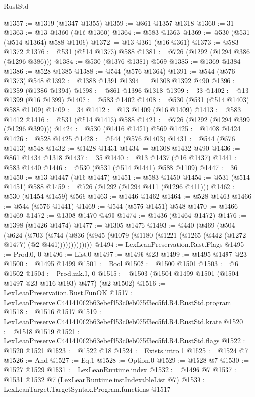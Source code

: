 \begin{lexlean}{RustStd}
\begin{coremodule}
@1357 := @1319 (@1347 @1355)
@1359 := @861 @1357 @1318
@1360 := 31
@1363 := @13 @1360 (@16 @1360)
@1364 := @583 @1363
@1369 := @530 (@531 (@514 @1364) @588 @1109)
@1372 := @13 @361 (@16 @361)
@1373 := @583 @1372
@1376 := @531 (@514 @1373) @588
@1381 := @726 (@1292 (@1294 @386 (@1296 @386)))
@1384 := @530 (@1376 @1381) @569
@1385 := @1369 @1384
@1386 := @528 @1385
@1388 := @544 (@576 @1364)
@1391 := @544 (@576 @1373) @548
@1392 := @1388 @1391
@1394 := @1308 @1392 @490
@1396 := @1359 (@1386 @1394)
@1398 := @861 @1396 @1318
@1399 := 33
@1402 := @13 @1399 (@16 @1399)
@1403 := @583 @1402
@1408 := @530 (@531 (@514 @1403) @588 @1109)
@1409 := 34
@1412 := @13 @1409 (@16 @1409)
@1413 := @583 @1412
@1416 := @531 (@514 @1413) @588
@1421 := @726 (@1292 (@1294 @399 (@1296 @399)))
@1424 := @530 (@1416 @1421) @569
@1425 := @1408 @1424
@1426 := @528 @1425
@1428 := @544 (@576 @1403)
@1431 := @544 (@576 @1413) @548
@1432 := @1428 @1431
@1434 := @1308 @1432 @490
@1436 := @861 @1434 @1318
@1437 := 35
@1440 := @13 @1437 (@16 @1437)
@1441 := @583 @1440
@1446 := @530 (@531 (@514 @1441) @588 @1109)
@1447 := 36
@1450 := @13 @1447 (@16 @1447)
@1451 := @583 @1450
@1454 := @531 (@514 @1451) @588
@1459 := @726 (@1292 (@1294 @411 (@1296 @411)))
@1462 := @530 (@1454 @1459) @569
@1463 := @1446 @1462
@1464 := @528 @1463
@1466 := @544 (@576 @1441)
@1469 := @544 (@576 @1451) @548
@1470 := @1466 @1469
@1472 := @1308 @1470 @490
@1474 := @1436 (@1464 @1472)
@1476 := @1398 (@1426 @1474)
@1477 := @1305 @1476
@1493 := @440
    (@469
      (@504
        (@624
          (@703
            (@744 (@836 (@945 (@1079 (@1180 (@1221 (@1265 (@442 (@1272 @1477) (@2 @441)))))))))))))
@1494 := LexLeanPreservation.Rust.Flags
@1495 := Prod.{0, 0}
@1496 := List.{0}
@1497 := @1496 @23
@1499 := @1495 @1497 @23
@1500 := @1495 @1499
@1501 := Bool
@1502 := @1500 @1501
@1503 := @6 @1502
@1504 := Prod.mk.{0, 0}
@1515 := @1503 (@1504 @1499 @1501 (@1504 @1497 @23 @116 @193) @477) (@2 @1502)
@1516 := LexLeanPreservation.Rust.FunOK
@1517 := LexLeanPreserve.C44141062b63ebef453c0eb035f3ec5fd.R4.RustStd.program
@1518 := @1516 @1517
@1519 := LexLeanPreserve.C44141062b63ebef453c0eb035f3ec5fd.R4.RustStd.krate
@1520 := @1518 @1519
@1521 := LexLeanPreserve.C44141062b63ebef453c0eb035f3ec5fd.R4.RustStd.flags
@1522 := @1520 @1521
@1523 := @1522 @18
@1524 := Exists.intro.{1}
@1525 := @1524 @7
@1526 := And
@1527 := Eq.{1}
@1528 := Option.{0}
@1529 := @1528 @7
@1530 := @1527 @1529
@1531 := LexLeanRuntime.index
@1532 := @1496 @7
@1537 := @1531 @1532 @7 (LexLeanRuntime.instIndexableList @7)
@1539 := LexLeanTarget.TargetSyntax.Program.functions @1517

\end{coremodule}
\end{lexlean}

